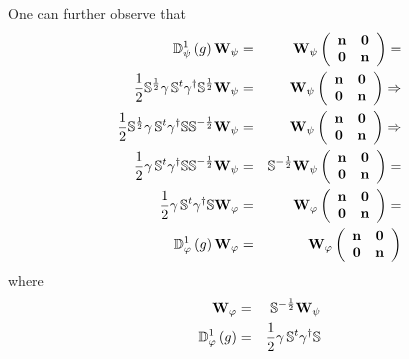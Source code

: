 \documentclass[aps,preprint]{revtex4}
\begin{document}
One can further observe that 
\begin{eqnarray}
\mathbb{D}_{\psi }^{1}\left( g\right) \mathbf{W}_{\psi } &=&\mathbf{W}_{\psi
}\left( 
\begin{array}{cc}
\mathbf{n} & \mathbf{0} \\ 
\mathbf{0} & \mathbf{n}%
\end{array}%
\right) =  \notag \\
\frac{1}{2}\mathbb{S}^{\frac{1}{2}}\mathbf{\gamma \,}\mathbb{S}^{t}\mathbf{%
\gamma }^{\dagger }\mathbb{S}^{\frac{1}{2}}\mathbf{W}_{\psi } &=&\mathbf{W}%
_{\psi }\left( 
\begin{array}{cc}
\mathbf{n} & \mathbf{0} \\ 
\mathbf{0} & \mathbf{n}%
\end{array}%
\right) \Rightarrow  \notag \\
\frac{1}{2}\mathbb{S}^{\frac{1}{2}}\mathbf{\gamma \,}\mathbb{S}^{t}\mathbf{%
\gamma }^{\dagger }\mathbb{SS}^{-\frac{1}{2}}\mathbf{W}_{\psi } &=&\mathbf{W}%
_{\psi }\left( 
\begin{array}{cc}
\mathbf{n} & \mathbf{0} \\ 
\mathbf{0} & \mathbf{n}%
\end{array}%
\right) \Rightarrow  \notag \\
\frac{1}{2}\mathbf{\gamma \,}\mathbb{S}^{t}\mathbf{\gamma }^{\dagger }%
\mathbb{SS}^{-\frac{1}{2}}\mathbf{W}_{\psi } &=&\mathbb{S}^{-\frac{1}{2}}%
\mathbf{W}_{\psi }\left( 
\begin{array}{cc}
\mathbf{n} & \mathbf{0} \\ 
\mathbf{0} & \mathbf{n}%
\end{array}%
\right) =  \notag \\
\frac{1}{2}\mathbf{\gamma \,}\mathbb{S}^{t}\mathbf{\gamma }^{\dagger }%
\mathbb{S}\mathbf{W}_{\varphi } &=&\mathbf{W}_{\varphi }\left( 
\begin{array}{cc}
\mathbf{n} & \mathbf{0} \\ 
\mathbf{0} & \mathbf{n}%
\end{array}%
\right) =  \notag \\
\mathbb{D}_{\varphi }^{1}\left( g\right) \mathbf{W}_{\varphi } &=&\mathbf{W}%
_{\varphi }\left( 
\begin{array}{cc}
\mathbf{n} & \mathbf{0} \\ 
\mathbf{0} & \mathbf{n}%
\end{array}%
\right)
\end{eqnarray}%
where 
\begin{eqnarray}
\mathbf{W}_{\varphi } &=&\mathbb{S}^{-\frac{1}{2}}\mathbf{W}_{\psi }  \notag
\\
\mathbb{D}_{\varphi }^{1}\left( g\right) &=&\frac{1}{2}\mathbf{\gamma \,}%
\mathbb{S}^{t}\mathbf{\gamma }^{\dagger }\mathbb{S}
\end{eqnarray}%
\end{document}
